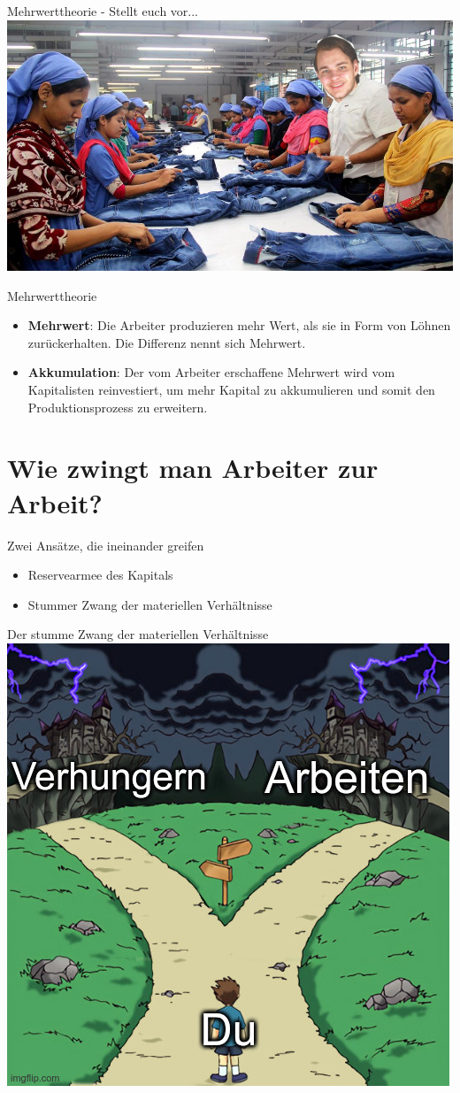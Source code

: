 \documentclass{beamer}
\begin{document}
\begin{frame}{Mehrwerttheorie - Stellt euch vor...}
\includegraphics[width=\textwidth]{naeherinnen.jpg}
\end{frame}
\begin{frame}{Mehrwerttheorie}
\begin{itemize}
    \item \textbf{Mehrwert}: Die Arbeiter produzieren mehr Wert, als sie in Form von Löhnen zurückerhalten. Die Differenz nennt sich Mehrwert.
    \item \textbf{Akkumulation}: Der vom Arbeiter erschaffene Mehrwert wird vom Kapitalisten reinvestiert, um mehr Kapital zu akkumulieren und somit den Produktionsprozess zu erweitern.
\end{itemize}
\end{frame}
\section{Wie zwingt man Arbeiter zur Arbeit?}
\begin{frame}{Zwei Ansätze, die ineinander greifen}
\begin{itemize}
 \item Reservearmee des Kapitals
 \item Stummer Zwang der materiellen Verhältnisse
\end{itemize}
\end{frame}
\begin{frame}{Der stumme Zwang der materiellen Verhältnisse}
\includegraphics[width=0.75\linewidth]{hungern-arbeiten.jpg}
\end{frame}
\end{document}
